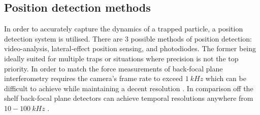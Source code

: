 \subsection{Position detection methods}
In order to accurately capture the dynamics of a trapped particle, 
a position detection system is utilised. There are 3 possible
methods of position detection: video-analysis, lateral-effect
position sensing, and photodiodes. The former being 
ideally suited for multiple traps or situations where precision
is not the top priority. In order to match the force measurements
of back-focal plane interferometry requires the camera's frame
rate to exceed $1\ kHz$ which can be difficult to achieve while 
maintaining a decent resolution \cite{Gibson2008}. In comparison
off the shelf back-focal plane detectors can achieve temporal
resolutions anywhere from $10-100\ kHz$ \cite{BergSoerensen2004}. 
 
